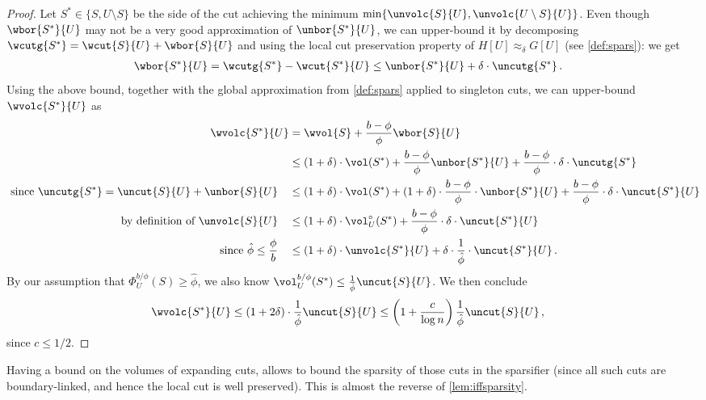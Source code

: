 \begin{proof}
	Let $S^* \in \{S, U \setminus S\}$ be the side of the cut achieving the minimum $\min\{\unvolc{S}{U}, \unvolc{U \setminus S}{U}\}$. Even though $\wbor{S^*}{U}$ may not be a very good approximation of $\unbor{S^*}{U}$, we can upper-bound it by decomposing  $\wcutg{S^*}=\wcut{S}{U}+\wbor{S}{U}$ and using the local cut preservation property of $H[U] \approx_\delta G[U]$ (see \cref{def:spars}): we get
	\begin{align*}
		\wbor{S^*}{U} & = \wcutg{S^*} - \wcut{S^*}{U} \le  \unbor{S^*}{U}+\delta \cdot \uncutg{S^*} \, .
	\end{align*}
Using the above bound, together with the global approximation from \cref{def:spars} applied to singleton cuts, we can upper-bound $\wvolc{S^*}{U}$ as
	\begin{align*}
		\wvolc{S^*}{U} & = \wvol{S}+\frac{b-\phi}{\phi}\wbor{S}{U} \\
		& \le  (1+\delta) \cdot \vol(S^*)+\frac{b-\phi}{\phi} \unbor{S^*}{U} + \frac{b-\phi}{\phi}  \cdot \delta \cdot \uncutg{S^*}\\
		\text{ since $\uncutg{S^*}=\uncut{S}{U}+\unbor{S}{U}$} \quad & \le (1+\delta) \cdot \vol(S^*)+ (1+\delta) \cdot\frac{b-\phi}{\phi}  \cdot \unbor{S^*}{U}+ \frac{b-\phi}{\phi}  \cdot \delta \cdot \uncut{S^*}{U}\\
		\text{ by definition of $\unvolc{S}{U}$} \quad & \le (1+\delta) \cdot \vol_U^{\circ}(S^*)+ \frac{b-\phi}{\phi}  \cdot \delta \cdot \uncut{S^*}{U}\\
		\text{ since $\hat{\phi} \le \frac{\phi}{b}$} \quad & \le (1+\delta) \cdot  \unvolc{S^*}{U} + \delta \cdot  \frac{1}{\hat{\phi}} \cdot \uncut{S^*}{U} \, .
	\end{align*}
By our assumption that $\Phi_U^{b/\phi}(S) \ge \hat{\phi}$, we also know $\vol_U^{b/\phi}(S^*) \le \frac{1}{\hat{\phi}} \uncut{S}{U}$. We then conclude
\begin{align*}
	\wvolc{S^*}{U}
	& \le (1+2\delta) \cdot \frac{1}{\hat{\phi}} \uncut{S}{U} \le \left(1+\frac{c}{\log n}\right) \frac{1}{\hat{\phi}} \uncut{S}{U}\, ,
\end{align*}
since $c \le 1/2$.
\end{proof}
\noindent
Having a bound on the volumes of expanding cuts, allows to bound the sparsity of those cuts in the sparsifier (since all such cuts are boundary-linked, and hence the local cut is well preserved). This is almost the reverse of \cref{lem:iffsparsity}.

